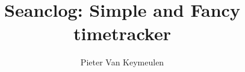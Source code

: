 \documentclass[a4paper,11pt]{article}
\begin{document}
\title{Seanclog: Simple and Fancy timetracker}
\author{Pieter Van Keymeulen}
\maketitle

\end{document}
